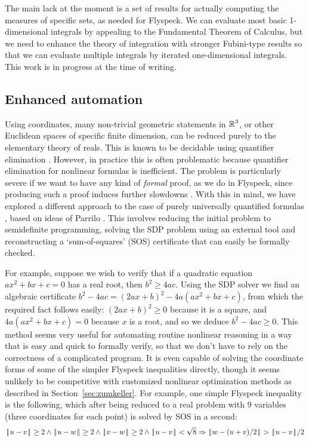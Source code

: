 \documentclass[11pt]{amsart}
\def\|{{\hskip0.1em|\hskip-0.15em|\hskip0.1em}}
\newcommand{\real}{\mbox{$\protect\mathbb R$}}
\let\And=\wedge                    %
\newcommand{\Imp}{\Rightarrow}
\begin{document}
The main lack at the moment is a set of results for actually computing the
measures of specific sets, as needed for Flyspeck. We can evaluate most basic
1-dimensional integrals by appealing to the Fundamental Theorem of Calculus,
but we need to enhance the theory of integration with stronger Fubini-type
results so that we can evaluate multiple integrals by iterated one-dimensional
integrals. This work is in progress at the time of writing.

\subsection*{Enhanced automation}

Using coordinates, many non-trivial geometric statements in $\real^3$, or other
Euclidean spaces of specific finite dimension, can be reduced purely to the
elementary theory of reals. This is known to be decidable using quantifier
elimination \cite{tarski-decision,collins,hormander-pdo2}. However, in practice
this is often problematic because quantifier elimination for nonlinear formulas
is inefficient. The problem is particularly severe if we want to have any kind
of {\em formal} proof, as we do in Flyspeck, since producing such a proof
induces further slowdowns \cite{mahboubi-hormander,mclaughlin-harrison}. With
this in mind, we have explored a different approach to the case of purely
universally quantified formulas \cite{harrison-sos}, based on ideas of Parrilo
\cite{parrilo-semidefinite}. This involves reducing the initial problem to
semidefinite programming, solving the SDP problem using an external tool and
reconstructing a `sum-of-squares' (SOS) certificate that can easily be formally
checked.

For example, suppose we wish to verify that if a quadratic equation $a x^2 + b
x + c = 0$ has a real root, then $b^2 \geq 4 a c$. Using the SDP solver we find
an algebraic certificate $b^2 - 4 a c = (2 a x + b)^2 - 4 a (a x^2 + b x + c)$,
from which the required fact follows easily: $(2 a x + b)^2 \geq 0$ because it
is a square, and $4 a (a x^2 + b x + c) = 0$ because $x$ is a root, and so we
deduce $b^2 - 4 a c \geq 0$. This method seems very useful for automating
routine nonlinear reasoning in a way that is easy and quick to formally verify,
so that we don't have to rely on the correctness of a complicated program. It
is even capable of solving the coordinate forms of some of the simpler Flyspeck
inequalities directly, though it seems unlikely to be competitive with
customized nonlinear optimization methods as described in Section~\ref{sec:zumkeller}. For
example, one simple Flyspeck inequality is the following, which after being
reduced to a real problem with 9 variables (three coordinates for each point)
is solved by SOS in a second:
$$ \|u - v\| \geq 2 \And \|u - w\| \geq 2 \And \|v - w\| \geq 2 \And
   \|u - v\| < \sqrt{8}
   \Imp \|w - (u + v)/2\| > \|u - v\|/2
$$
\end{document}
